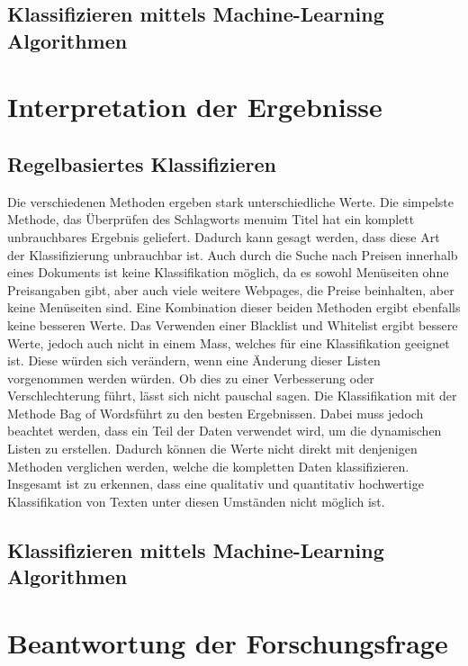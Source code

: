 \subsection{Klassifizieren mittels Machine-Learning Algorithmen}
\section{Interpretation der Ergebnisse}
\subsection{Regelbasiertes Klassifizieren}
Die verschiedenen Methoden ergeben stark unterschiedliche Werte.
Die simpelste Methode, das Überprüfen des Schlagworts \glqq menu\grqq im Titel hat ein komplett unbrauchbares Ergebnis geliefert.
Dadurch kann gesagt werden, dass diese Art der Klassifizierung unbrauchbar ist.
Auch durch die Suche nach Preisen innerhalb eines Dokuments ist keine Klassifikation möglich, da es sowohl Menüseiten ohne Preisangaben gibt, aber auch viele weitere Webpages, die Preise beinhalten, aber keine Menüseiten sind.
Eine Kombination dieser beiden Methoden ergibt ebenfalls keine besseren Werte.
Das Verwenden einer Blacklist und Whitelist ergibt bessere Werte, jedoch auch nicht in einem Mass, welches für eine Klassifikation geeignet ist.
Diese würden sich verändern, wenn eine Änderung dieser Listen vorgenommen werden würden.
Ob dies zu einer Verbesserung oder Verschlechterung führt, lässt sich nicht pauschal sagen.
Die Klassifikation mit der Methode \glqq Bag of Words\grqq führt zu den besten Ergebnissen.
Dabei muss jedoch beachtet werden, dass ein Teil der Daten verwendet wird, um die dynamischen Listen zu erstellen.
Dadurch können die Werte nicht direkt mit denjenigen Methoden verglichen werden, welche die kompletten Daten klassifizieren. 
Insgesamt ist zu erkennen, dass eine qualitativ und quantitativ hochwertige Klassifikation von Texten unter diesen Umständen nicht möglich ist.
\subsection{Klassifizieren mittels Machine-Learning Algorithmen}
\section{Beantwortung der Forschungsfrage}
